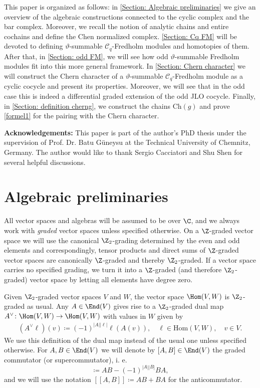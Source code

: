 \documentclass[a4paper, english, 12pt, bibliography=totocnumbered,
index=totoc]{scrartcl}
\begin{document}
This paper is organized as follows: in \cref{Section: Algebraic
preliminaries} we give an overview of the algebraic constructions connected
to the cyclic complex and the bar complex.
Moreover, we recall the notion of analytic chains and entire cochains and
define the Chen normalized complex.
\cref{Section: Cq FM} will be devoted to defining $\vartheta$-summable
$\mathcal{C}_q$-Fredholm modules and homotopies of them.
After that, in \cref{Section: odd FM}, we will see how odd
$\vartheta$-summable Fredholm modules fit into this more general framework.
In \cref{Section: Chern character} we will construct the Chern character of a
$\vartheta$-summable $\mathcal{C}_q$-Fredholm module as a cyclic cocycle and
present its properties.
Moreover, we will see that in the odd case this is indeed a differential
graded extension of the odd JLO cocycle.
Finally, in \cref{Section: definition cherng}, we construct the chains
$\mathrm{Ch}(g)$ and prove \cref{formel1} for the pairing with
the Chern character.

\textbf{Acknowledgements:} This paper is part of the author's PhD thesis under
the supervision of Prof. \!Dr. \!Batu Güneysu at the Technical University of
Chemnitz, Germany.
The author would like to thank Sergio Cacciatori and Shu Shen for several
helpful discussions.
\section{Algebraic preliminaries}\label{Section: Algebraic preliminaries}
All vector spaces and algebras will be assumed to be over $\C$, and we always
work with \textit{graded} vector spaces unless specified otherwise.
On a $\Z$-graded vector space we will use the canonical $\Z_2$-grading 
determined by the even and odd elements and correspondingly, tensor products 
and direct sums of $\Z$-graded vector spaces are canonically $\Z$-graded and 
thereby $\Z_2$-graded.
If a vector space carries no specified grading, we turn it into a 
$\Z$-graded (and therefore $\Z_2$-graded) vector space by letting all 
elements have degree zero.

Given $\Z_2$-graded vector spaces $V$ and $W$, the vector space
$\Hom(V, W)$ is $\Z_2$-graded as usual.
Any $A \in \End(V)$ gives rise to a $\Z_2$-graded dual map $A^{\vee} \colon 
\Hom(V, W) \to \Hom(V, W)$ with values in $W$ given by
\begin{align*}
	(A^{\vee}\ell) (v) \coloneqq (-1)^{|A||\ell|}\ell (A(v)), \quad \ell\in
	\mathrm{Hom}(V,W), \quad v\in V.
\end{align*}
We use this definition of the dual map instead of the usual one unless 
specified otherwise.
For $A, B\in \End(V)$ we will denote by $[A, B] \in \End(V)$
the graded commutator (or supercommutator), i. e.
\begin{equation*}
	[A,B] \coloneqq AB-(-1)^{|A||B|}BA,
\end{equation*}
and we will use the notation $[[A, B]] \coloneqq AB + BA$ for the 
anticommutator.
\end{document}
